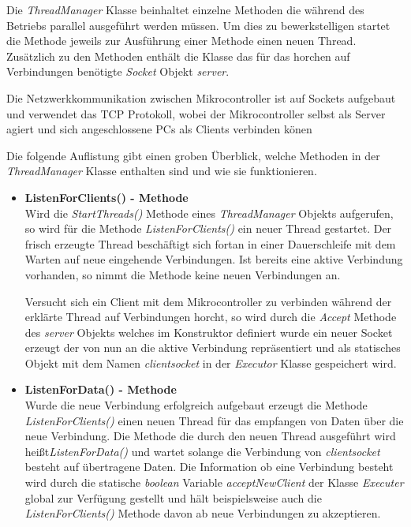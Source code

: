 Die \textit{ThreadManager} Klasse beinhaltet einzelne Methoden die während des Betriebs parallel ausgeführt werden müssen. Um dies zu bewerkstelligen startet die Methode jeweils zur Ausführung einer Methode einen neuen Thread. Zusätzlich zu den Methoden enthält die Klasse das für das horchen auf Verbindungen benötigte \textit{Socket} Objekt \textit{server}.

Die Netzwerkkommunikation zwischen Mikrocontroller ist auf Sockets aufgebaut und verwendet das TCP Protokoll, wobei der Mikrocontroller selbst als Server agiert und sich angeschlossene PCs als Clients verbinden könen

Die folgende Auflistung gibt einen groben Überblick, welche Methoden in der \textit{ThreadManager} Klasse enthalten sind und wie sie funktionieren.

\begin{itemize}
\item \textbf{ListenForClients() - Methode}\\
Wird die \textit{StartThreads()} Methode eines \textit{ThreadManager} Objekts aufgerufen, so wird für die Methode \textit{ListenForClients()} ein neuer Thread gestartet. Der frisch erzeugte Thread beschäftigt sich fortan in einer Dauerschleife mit dem Warten auf neue eingehende Verbindungen. Ist bereits eine aktive Verbindung vorhanden, so nimmt die Methode keine neuen Verbindungen an.

Versucht sich ein Client mit dem Mikrocontroller zu verbinden während der erklärte Thread auf Verbindungen horcht, so wird durch die \textit{Accept} Methode des \textit{server} Objekts welches im Konstruktor definiert wurde ein neuer Socket erzeugt der von nun an die aktive Verbindung repräsentiert und als statisches Objekt mit dem Namen \textit{clientsocket} in der \textit{Executor} Klasse gespeichert wird.

\item \textbf{ListenForData() - Methode}\\
Wurde die neue Verbindung erfolgreich aufgebaut erzeugt die Methode \textit{ListenForClients()} einen neuen Thread für das empfangen von Daten über die neue Verbindung. Die Methode die durch den neuen Thread ausgeführt wird heißt\textit{ListenForData()} und wartet solange die Verbindung von \textit{clientsocket} besteht auf übertragene Daten. 
Die Information ob eine Verbindung besteht wird durch die statische \textit{boolean} Variable \textit{acceptNewClient} der Klasse \textit{Executer} global zur Verfügung gestellt und hält beispielsweise auch die \textit{ListenForClients()} Methode davon ab neue Verbindungen zu akzeptieren.


\end{itemize}
